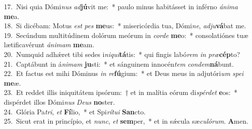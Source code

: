 {17.~}Nisi quia Dómi\textit{nus} \textit{ad}\textbf{jú}vit me:~* paulo minus habitásset in inférno \textit{á}\textit{ni}\textit{ma} \textbf{me}a.\\
{18.~}Si dicébam: Motus \textit{est} \textit{pes} \textbf{me}us:~* misericórdia tua, Dómi\textit{ne}, \textit{ad}\textit{ju}\textbf{vá}bat me.\\
{19.~}Secúndum multitúdinem dolórum meórum in \textit{cor}\textit{de} \textbf{me}o:~* consolatiónes tuæ lætificavérunt \textit{á}\textit{ni}\textit{mam} \textbf{me}am.\\
{20.~}Numquid adhǽret tibi sedes i\textit{ni}\textit{qui}\textbf{tá}tis:~* qui fingis labó\textit{rem} \textit{in} \textit{præ}\textbf{cép}to?\\
{21.~}Captábunt in á\textit{ni}\textit{mam} \textbf{ju}sti:~* et sánguinem innocén\textit{tem} \textit{con}\textit{dem}\textbf{ná}bunt.\\
{22.~}Et factus est mihi Dóminus \textit{in} \textit{re}\textbf{fú}gium:~* et Deus meus in adjutóri\textit{um} \textit{spe}\textit{i} \textbf{me}æ.\\
{23.~}Et reddet illis iniquitátem ipsórum:~† et in malítia eórum di\textit{spér}\textit{det} \textbf{e}os:~* dispérdet illos Dómi\textit{nus} \textit{De}\textit{us} \textbf{no}ster.\\
{24.~}Glória Pa\textit{tri}, \textit{et} \textbf{Fí}lio,~* et Spi\textit{rí}\textit{tu}\textit{i} \textbf{San}cto.\\
{25.~}Sicut erat in princípio, et \textit{nunc}, \textit{et} \textbf{sem}per,~* et in sǽcula sæ\textit{cu}\textit{ló}\textit{rum}. \textbf{A}men.\\
